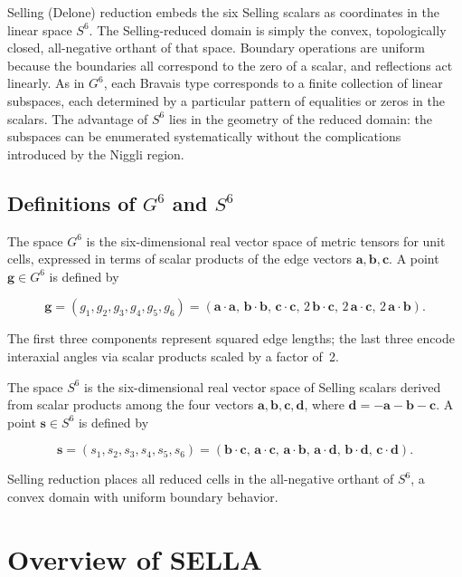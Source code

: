 \documentclass[preprint]{iucr}              %
\begin{document}
	Selling (Delone) reduction embeds the six Selling scalars as coordinates in
	the linear space $S^6$. The Selling-reduced domain is simply the convex,
	topologically closed, all-negative orthant of that space. Boundary operations are uniform because the boundaries all correspond to
	the zero of a scalar,
	and reflections act linearly. As in $G^6$, each Bravais type corresponds to a
	finite collection of linear subspaces, each determined by a particular pattern
	of equalities or zeros in the scalars. The advantage of $S^6$ lies in the
	geometry of the reduced domain: the subspaces can be enumerated
	systematically without the complications introduced by the Niggli region.
	
	\subsection{Definitions of $G^6$ and $S^6$}
	
	The space $G^6$ is the six-dimensional real vector space of metric tensors for
	unit cells, expressed in terms of scalar products of the edge vectors
	$\mathbf{a}, \mathbf{b}, \mathbf{c}$. A point $\mathbf{g} \in G^6$ is defined by
	
	
	\[
	\mathbf{g} = (g_1, g_2, g_3, g_4, g_5, g_6)
	= \left( \mathbf{a}\!\cdot\!\mathbf{a},\,
	\mathbf{b}\!\cdot\!\mathbf{b},\,
	\mathbf{c}\!\cdot\!\mathbf{c},\,
	2\,\mathbf{b}\!\cdot\!\mathbf{c},\,
	2\,\mathbf{a}\!\cdot\!\mathbf{c},\,
	2\,\mathbf{a}\!\cdot\!\mathbf{b} \right).
	\]
	
	
	The first three components represent squared edge lengths; the last three
	encode interaxial angles via scalar products scaled by a factor of~2.
	
	The space $S^6$ is the six-dimensional real vector space of Selling scalars
	derived from scalar products among the four vectors
	$\mathbf{a}, \mathbf{b}, \mathbf{c}, \mathbf{d}$, where
	$\mathbf{d} = -\mathbf{a} - \mathbf{b} - \mathbf{c}$. A point
	$\mathbf{s} \in S^6$ is defined by
	
	
	\[
	\mathbf{s} = (s_1, s_2, s_3, s_4, s_5, s_6)
	= \left( \mathbf{b}\!\cdot\!\mathbf{c},\,
	\mathbf{a}\!\cdot\!\mathbf{c},\,
	\mathbf{a}\!\cdot\!\mathbf{b},\,
	\mathbf{a}\!\cdot\!\mathbf{d},\,
	\mathbf{b}\!\cdot\!\mathbf{d},\,
	\mathbf{c}\!\cdot\!\mathbf{d} \right).
	\]
	
	
	Selling reduction places all reduced cells in the all-negative orthant of
	$S^6$, a convex domain with uniform boundary behavior.
	
	\section{Overview of SELLA}
	
\end{document}
